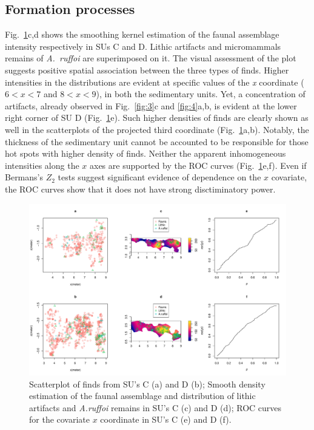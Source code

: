 \documentclass[5p,authoryear]{elsarticle} %
\begin{document}
\subsection{Formation processes}

Fig.~\ref{fig:5}c,d shows the smoothing kernel estimation of the faunal assemblage intensity respectively in SUs C and D. Lithic artifacts and micromammals remains of \emph{A.~ruffoi} are superimposed on it. The visual assessment of the plot suggests positive spatial association between the three types of finds. Higher intensities in the distributions are evident at specific values of the \emph{x} coordinate ($6<x<7$ and $8<x<9$), in both the sedimentary units. Yet, a concentration of artifacts, already observed in Fig.~\ref{fig:3}c and \ref{fig:4}a,b, is evident at the lower right corner of SU D (Fig.~\ref{fig:5}e). Such higher densities of finds are clearly shown as well in the scatterplots of the projected third coordinate (Fig.~\ref{fig:5}a,b). Notably, the thickness of the sedimentary unit cannot be accounted to be responsible for those hot spots with higher density of finds. Neither the apparent inhomogeneous intensities along the $x$ axes are supported by the ROC curves (Fig.~\ref{fig:5}e,f). Even if Bermans's $Z_2$ tests suggest significant evidence of dependence on the $x$ covariate, the ROC curves show that it does not have strong disctiminatory power.

\begin{figure}[t]
  \centering
  \includegraphics[width=1\textwidth]{../artwork/Fig5.pdf}
  \caption{Scatterplot of finds from SU's C (a) and D (b); Smooth density estimation of the faunal assemblage and distribution of lithic artifacts and \emph{A.ruffoi} remains in SU's C (c) and D (d); ROC curves for the covariate $x$ coordinate in SU's C (e) and D (f).}
  \label{fig:5}
\end{figure}
\end{document}
